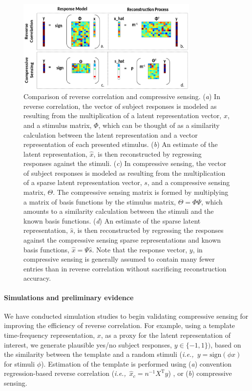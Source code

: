 \documentclass[11pt, notitlepage]{article} %
\def\ie{{\emph{i.e.,}}~}
\begin{document}
\begin{figure}[h] %
	\centering
	\includegraphics[width=0.8\textwidth]{Figures/Figures_tinnitus_5.png}
	\caption{Comparison of reverse correlation and compressive sensing.
	(\emph{a}) In reverse correlation, the vector of subject responses is modeled as
	resulting from the multiplication of a latent representation vector, $x$,
	and a stimulus matrix, $\Phi$, which can be thought of as a similarity calculation
	between the latent representation and a vector representation of each presented stimulus.
	(\emph{b}) An estimate of the latent representation, $\hat{x}$, is then reconstructed
	by regressing responses against the stimuli.
	(\emph{c}) In compressive sensing,
	the vector of subject responses is modeled as resulting from the multiplication
	of a sparse latent representation vector, $s$, and a compressive sensing matrix, $\Theta$.
	The compressive sensing matrix is formed by multiplying a matrix of basis functions
	by the stimulus matrix, $\Theta = \Phi \Psi$, which amounts to a similarity calculation
	between the stimuli and the known basis functions.
	(\emph{d}) An estimate of the sparse latent representation, $\hat{s}$, is then reconstructed
	by regressing the responses against the compressive sensing sparse representations
	and known basis functions, $\hat{x} = \Psi \hat{s}$. Note that the response vector, $y$,
	in compressive sensing is generally assumed to contain many fewer entries than
	in reverse correlation without sacrificing reconstruction accuracy.}
	\label{fig:csexplanation}
\end{figure}

\paragraph{Simulations and preliminary evidence}

We have conducted simulation studies to begin validating compressive sensing
for improving the efficiency of reverse correlation.
For example, using a template time-frequency representation, $x$,
as a proxy for the latent representation of interest,
we generate plausible yes/no subject responses, $y \in \{-1, 1\})$,
based on the similarity between the template
and a random stimuli (\ie $y = \mathrm{sign}(\phi x)$ for stimuli $\phi$).
Estimation of the template is performed using
(\emph{a}) convention regression-based reverse correlation
(\ie $\hat{x}_c = n^{-1} X^\mathrm{T}y$) \cite{gosselinSuperstitiousPerceptionsReveal2003},
or (\emph{b}) compressive sensing.
\end{document}
